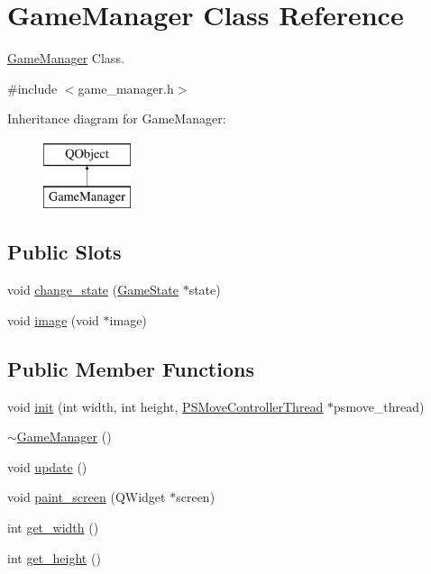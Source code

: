 \hypertarget{class_game_manager}{\section{Game\-Manager Class Reference}
\label{class_game_manager}
}


\hyperlink{class_game_manager}{Game\-Manager} Class.  




{\ttfamily \#include $<$game\-\_\-manager.\-h$>$}

Inheritance diagram for Game\-Manager\-:\begin{figure}[H]
\begin{center}
\leavevmode
\includegraphics[height=2.000000cm]{class_game_manager}
\end{center}
\end{figure}
\subsection*{Public Slots}
\begin{DoxyCompactItemize}
\item 
void \hyperlink{class_game_manager_a60d891c730d679638699313b32554fc3}{change\-\_\-state} (\hyperlink{class_game_state}{Game\-State} $\ast$state)
\item 
void \hyperlink{class_game_manager_a95f0287ced8a2bc8d27fb5ec1a65eff2}{image} (void $\ast$image)
\end{DoxyCompactItemize}
\subsection*{Public Member Functions}
\begin{DoxyCompactItemize}
\item 
void \hyperlink{class_game_manager_a20ffdea8c56aa5d364554aa04eace73b}{init} (int width, int height, \hyperlink{class_p_s_move_controller_thread}{P\-S\-Move\-Controller\-Thread} $\ast$psmove\-\_\-thread)
\item 
\hyperlink{class_game_manager_aaae63e38e358379c1fe507c5197a8435}{$\sim$\-Game\-Manager} ()
\item 
void \hyperlink{class_game_manager_a7ecc3a14cd9e92f50729b37d1364953f}{update} ()
\item 
void \hyperlink{class_game_manager_adc2d500cc9ec8eaad8b9414b8eeffc97}{paint\-\_\-screen} (Q\-Widget $\ast$screen)
\item 
int \hyperlink{class_game_manager_a2c3a78c8ea991f7bdc2e7e935c791a88}{get\-\_\-width} ()
\item 
int \hyperlink{class_game_manager_a610beadc7ccea38d546dd17278e05a76}{get\-\_\-height} ()
\end{DoxyCompactItemize}
